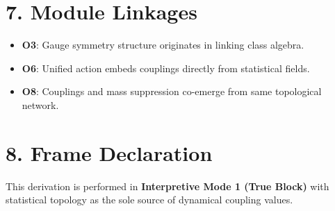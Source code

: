\documentclass[12pt]{article}
\begin{document}
\section*{7. Module Linkages}

\begin{itemize}
    \item \textbf{O3}: Gauge symmetry structure originates in linking class algebra.
    \item \textbf{O6}: Unified action embeds couplings directly from statistical fields.
    \item \textbf{O8}: Couplings and mass suppression co-emerge from same topological network.
\end{itemize}

\section*{8. Frame Declaration}

This derivation is performed in \textbf{Interpretive Mode 1 (True Block)} with statistical topology as the sole source of dynamical coupling values.
\end{document}
